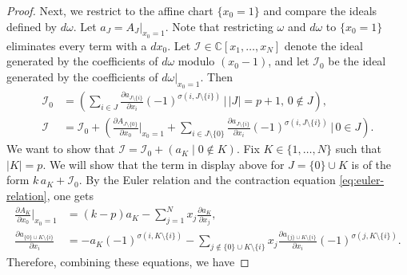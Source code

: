 \documentclass[a4paper, 11pt]{amsart}
\newcommand{\CC}{\mathbb{C}}
\theoremstyle{plain}
\numberwithin{theorem}{section}
\theoremstyle{definition}
\newcommand{\cI}{\mathcal{I}}
\begin{document}
\begin{proof}
Next, we restrict to the affine chart $\{x_0 = 1\}$ and compare the ideals defined by $d\omega$. Let $a_J = A_J|_{x_0=1}$. Note that restricting $\omega$ and $d\omega$ to $\{x_0 = 1\}$ eliminates every term with a $dx_0$. Let $\cI\in \CC[x_1, \dots, x_N]$ denote the ideal generated by the coefficients of $d\omega$ modulo $(x_0 -1)$, and let $\cI_0$ be the ideal generated by the coefficients of $d\omega|_{x_0=1}$. Then
\begin{align*}
    \cI_0 &= \left(\sum_{i\in J} \frac{\partial a_{J\setminus \{i\} }}{\partial x_i} (-1)^{\sigma(i,J\setminus \{i\})}  \,\Big|\, |J| = p+1 , \, 0 \not\in J  \right), \\
    \cI &= \cI_0 + \left(\frac{\partial A_{J\setminus \{0\} }}{\partial x_0}\Big|_{x_0= 1} + \sum_{i\in J \setminus \{0\}} \frac{\partial a_{J\setminus \{i\} }}{\partial x_i} (-1)^{\sigma(i,J\setminus \{i\})} \,\Big|\, 0 \in J  \right).
\end{align*}
We want to show that $\cI = \cI_0 + (a_K \mid 0\not\in K)$. Fix $K\in \{1, \dots , N\}$ such that $|K|=p$. We will show that the term in display above for $J = \{0\}\cup K$ is of the form $k\,a_K + \cI_0$. By the Euler relation and the contraction equation \eqref{eq:euler-relation}, one gets
\begin{align*}
    \frac{\partial A_{K}}{\partial x_0}\Big|_{x_0= 1} & = (k-p)a_K -\sum_{j=1}^N x_j\frac{\partial a_{K}}{\partial x_j} ,\\
    \frac{\partial a_{\{0\} \cup K  \setminus \{i\} }}{\partial x_i} &= -a_K(-1)^{\sigma(i,K \setminus \{i\})} - \sum_{j \not\in \{0\} \cup K\setminus \{i\}} x_j\frac{\partial a_{\{j\} \cup K\setminus \{i\}}}{\partial x_i}(-1)^{\sigma(j,K\setminus \{i\})}.
\end{align*}
Therefore, combining these equations, we have

\end{proof}
\end{document}
